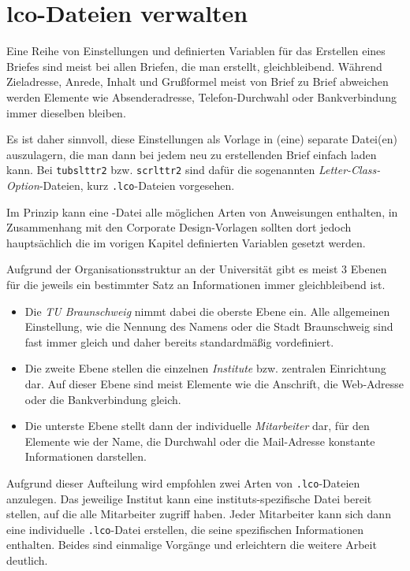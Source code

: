 \section{lco-Dateien verwalten}\label{sec:lco}

Eine Reihe von Einstellungen und definierten Variablen für das Erstellen eines
Briefes sind meist bei allen Briefen, die man erstellt, gleichbleibend.
Während Zieladresse, Anrede, Inhalt und Grußformel meist von Brief zu Brief
abweichen werden Elemente wie Absenderadresse, Telefon-Durchwahl oder
Bankverbindung immer dieselben bleiben.

Es ist daher sinnvoll, diese Einstellungen als Vorlage in (eine) separate Datei(en)
auszulagern, die man dann bei jedem neu zu erstellenden Brief einfach laden
kann. Bei \texttt{tubslttr2} bzw. \texttt{scrlttr2} sind dafür die sogenannten
\emph{Letter-Class-Option}-Dateien, kurz \texttt{.lco}-Dateien vorgesehen.

Im Prinzip kann eine -Datei alle möglichen Arten von Anweisungen
enthalten, in Zusammenhang mit den Corporate Design-Vorlagen sollten dort jedoch
hauptsächlich die im vorigen Kapitel definierten Variablen gesetzt werden.

Aufgrund der Organisationsstruktur an der Universität gibt es meist 3 Ebenen für
die jeweils ein bestimmter Satz an Informationen immer gleichbleibend ist.

\begin{itemize}
  \item Die \emph{TU Braunschweig} nimmt dabei die oberste Ebene ein.
    Alle allgemeinen Einstellung, wie die Nennung des Namens oder die Stadt Braunschweig sind
    fast immer gleich und daher bereits standardmäßig vordefiniert.

  \item Die zweite Ebene stellen die einzelnen \emph{Institute} bzw.
    zentralen Einrichtung dar. Auf dieser Ebene sind meist Elemente wie die
    Anschrift, die Web-Adresse oder die Bankverbindung gleich.

  \item Die unterste Ebene stellt dann der individuelle \emph{Mitarbeiter} dar,
    für den Elemente wie der Name, die Durchwahl oder die Mail-Adresse konstante
    Informationen darstellen.
\end{itemize}

Aufgrund dieser Aufteilung wird empfohlen zwei Arten von \texttt{.lco}-Dateien
anzulegen. Das jeweilige Institut kann eine instituts-spezifische Datei
bereit stellen, auf die alle Mitarbeiter zugriff haben. Jeder Mitarbeiter kann
sich dann eine individuelle \texttt{.lco}-Datei erstellen, die seine spezifischen
Informationen enthalten. Beides sind einmalige Vorgänge und erleichtern die
weitere Arbeit deutlich.

